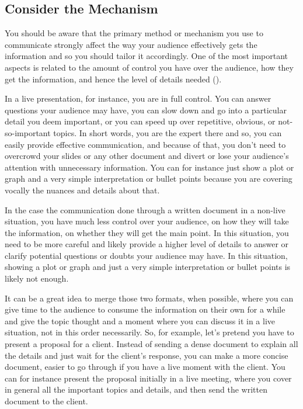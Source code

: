 \documentclass[
]{krantz}
\begin{document}
\hypertarget{consider-the-mechanism}{%
\subsection{Consider the Mechanism}\label{consider-the-mechanism}}

You should be aware that the primary method or mechanism you use to communicate strongly affect the way your audience effectively gets the information and so you should tailor it accordingly. One of the most important aspects is related to the amount of control you have over the audience, how they get the information, and hence the level of details needed (\citet{Knaflic2015}).

In a live presentation, for instance, you are in full control. You can answer questions your audience may have, you can slow down and go into a particular detail you deem important, or you can speed up over repetitive, obvious, or not-so-important topics. In short words, you are the expert there and so, you can easily provide effective communication, and because of that, you don't need to overcrowd your slides or any other document and divert or lose your audience's attention with unnecessary information. You can for instance just show a plot or graph and a very simple interpretation or bullet points because you are covering vocally the nuances and details about that.

In the case the communication done through a written document in a non-live situation, you have much less control over your audience, on how they will take the information, on whether they will get the main point. In this situation, you need to be more careful and likely provide a higher level of details to answer or clarify potential questions or doubts your audience may have. In this situation, showing a plot or graph and just a very simple interpretation or bullet points is likely not enough.

It can be a great idea to merge those two formats, when possible, where you can give time to the audience to consume the information on their own for a while and give the topic thought and a moment where you can discuss it in a live situation, not in this order necessarily. So, for example, let's pretend you have to present a proposal for a client. Instead of sending a dense document to explain all the details and just wait for the client's response, you can make a more concise document, easier to go through if you have a live moment with the client. You can for instance present the proposal initially in a live meeting, where you cover in general all the important topics and details, and then send the written document to the client.
\end{document}
